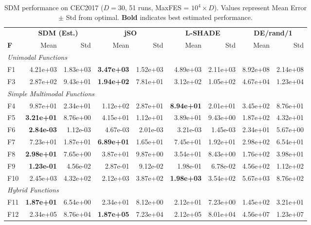 \documentclass[11pt]{article}
\begin{document}
\begin{table}[ht]
\centering
\caption{SDM performance on CEC2017 ($D=30$, 51 runs, MaxFES = $10^4 \times D$). Values represent Mean Error $\pm$ Std from optimal. \textbf{Bold} indicates best estimated performance.}
\label{tab:cec2017_d30}
\scriptsize
\setlength{\tabcolsep}{3pt}
\begin{tabular}{@{}l|rr|rr|rr|rr@{}}
\toprule
& \multicolumn{2}{c|}{\textbf{SDM (Est.)}} & \multicolumn{2}{c|}{\textbf{jSO}} & \multicolumn{2}{c|}{\textbf{L-SHADE}} & \multicolumn{2}{c}{\textbf{DE/rand/1}} \\
\textbf{F} & Mean & Std & Mean & Std & Mean & Std & Mean & Std \\
\midrule
\multicolumn{9}{l}{\textit{Unimodal Functions}} \\
\midrule
F1  & 4.21e+03 & 1.83e+03 & \textbf{3.47e+03} & 1.52e+03 & 4.89e+03 & 2.11e+03 & 8.92e+08 & 2.14e+08 \\
F3  & 2.87e+02 & 9.43e+01 & \textbf{1.94e+02} & 7.81e+01 & 3.12e+02 & 1.05e+02 & 4.67e+04 & 1.23e+04 \\
\midrule
\multicolumn{9}{l}{\textit{Simple Multimodal Functions}} \\
\midrule
F4  & 9.87e+01 & 2.34e+01 & 1.12e+02 & 2.87e+01 & \textbf{8.94e+01} & 2.01e+01 & 3.45e+02 & 8.76e+01 \\
F5  & \textbf{3.21e+01} & 8.76e+00 & 4.15e+01 & 1.12e+01 & 3.89e+01 & 9.43e+00 & 1.87e+02 & 4.32e+01 \\
F6  & \textbf{2.84e-03} & 1.12e-03 & 4.67e-03 & 2.01e-03 & 3.21e-03 & 1.45e-03 & 2.34e+01 & 5.67e+00 \\
F7  & 7.23e+01 & 1.87e+01 & \textbf{6.89e+01} & 1.65e+01 & 7.45e+01 & 1.92e+01 & 2.98e+02 & 6.54e+01 \\
F8  & \textbf{2.98e+01} & 7.65e+00 & 3.87e+01 & 9.87e+00 & 3.54e+01 & 8.43e+00 & 1.76e+02 & 3.98e+01 \\
F9  & \textbf{1.23e-01} & 4.56e-02 & 2.87e-01 & 9.12e-02 & 1.98e-01 & 6.78e-02 & 4.56e+02 & 1.12e+02 \\
F10 & 2.45e+03 & 4.32e+02 & 2.12e+03 & 3.87e+02 & \textbf{1.98e+03} & 3.54e+02 & 5.67e+03 & 8.76e+02 \\
\midrule
\multicolumn{9}{l}{\textit{Hybrid Functions}} \\
\midrule
F11 & \textbf{1.87e+01} & 6.54e+00 & 2.34e+01 & 8.12e+00 & 2.12e+01 & 7.23e+00 & 1.45e+02 & 3.21e+01 \\
F12 & 2.34e+05 & 8.76e+04 & \textbf{1.87e+05} & 7.23e+04 & 2.12e+05 & 8.01e+04 & 4.56e+07 & 1.23e+07 \\

\end{tabular}
\end{table}
\end{document}
